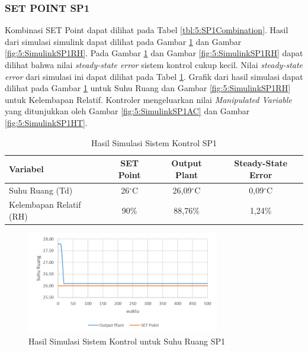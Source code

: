 \subsubsection{SET POINT SP1}

Kombinasi SET Point dapat dilihat pada Tabel \ref{tbl:5:SP1Combination}. Hasil dari simulasi simulink dapat dilihat pada Gambar \ref{fig:5:SimulinkSP1Td} dan Gambar \ref{fig:5:SimulinkSP1RH}. Pada Gambar \ref{fig:5:SimulinkSP1Td} dan Gambar \ref{fig:5:SimulinkSP1RH} dapat dilihat bahwa nilai \textit{steady-state error} sistem kontrol cukup kecil. Nilai \textit{steady-state error} dari simulasi ini dapat dilihat pada Tabel \ref{tbl:5:SP1Ess}. Grafik dari hasil simulasi dapat dilihat pada Gambar \ref{fig:5:SimulinkSP1Td} untuk Suhu Ruang dan Gambar \ref{fig:5:SimulinkSP1RH} untuk Kelembapan Relatif. Kontroler mengeluarkan nilai \textit{Manipulated Variable} yang ditunjukkan oleh Gambar \ref{fig:5:SimulinkSP1AC} dan Gambar \ref{fig:5:SimulinkSP1HT}.\\

\begin{table}[!h]
	\caption{Hasil Simulasi Sistem Kontrol SP1}
	\label{tbl:5:SP1Ess}
	\centering
	\begin{tabular}{|l|c|c|c|}
		\hline
		\textbf{Variabel} & \textbf{SET Point} & \textbf{Output Plant} & \textbf{Steady-State Error}\\ \hline
		Suhu Ruang (Td) & 26$^\circ$C & 26,09$^\circ$C & 0,09$^\circ$C \\ \hline
		Kelembapan Relatif (RH) & 90\% & 88,76\% & 1,24\% \\ \hline
	\end{tabular}
\end{table}
\hfill\break

\begin{figure}[!h]
	\centering
	\includegraphics[width=0.75\textwidth]{figures/SimulinkSP1Td}
	\caption{Hasil Simulasi Sistem Kontrol untuk Suhu Ruang SP1}
	\label{fig:5:SimulinkSP1Td}
\end{figure}

